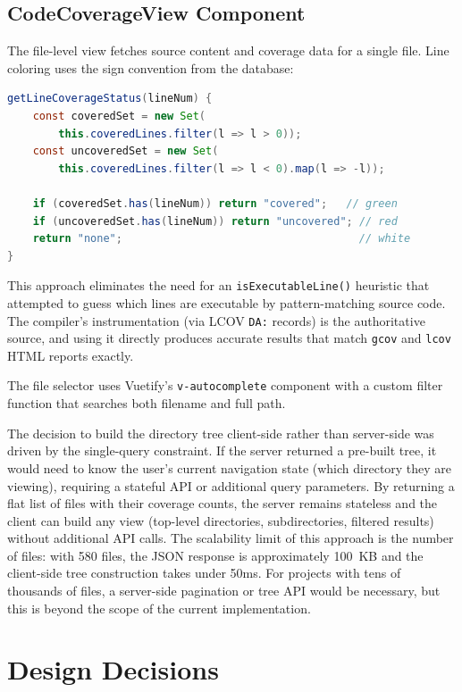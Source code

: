 \subsection{CodeCoverageView Component}

The file-level view fetches source content and coverage data for a single file. Line coloring uses the sign convention from the database:

\begin{lstlisting}[language=Java, caption={Sign-based line coloring}]
getLineCoverageStatus(lineNum) {
    const coveredSet = new Set(
        this.coveredLines.filter(l => l > 0));
    const uncoveredSet = new Set(
        this.coveredLines.filter(l => l < 0).map(l => -l));

    if (coveredSet.has(lineNum)) return "covered";   // green
    if (uncoveredSet.has(lineNum)) return "uncovered"; // red
    return "none";                                     // white
}
\end{lstlisting}

This approach eliminates the need for an \texttt{isExecutableLine()} heuristic that attempted to guess which lines are executable by pattern-matching source code. The compiler's instrumentation (via LCOV \texttt{DA:} records) is the authoritative source, and using it directly produces accurate results that match \texttt{gcov} and \texttt{lcov} HTML reports exactly.

The file selector uses Vuetify's \texttt{v-autocomplete} component with a custom filter function that searches both filename and full path.

The decision to build the directory tree client-side rather than server-side was driven by the single-query constraint. If the server returned a pre-built tree, it would need to know the user's current navigation state (which directory they are viewing), requiring a stateful API or additional query parameters. By returning a flat list of files with their coverage counts, the server remains stateless and the client can build any view (top-level directories, subdirectories, filtered results) without additional API calls. The scalability limit of this approach is the number of files: with 580 files, the JSON response is approximately 100~KB and the client-side tree construction takes under 50ms. For projects with tens of thousands of files, a server-side pagination or tree API would be necessary, but this is beyond the scope of the current implementation.

\section{Design Decisions}

